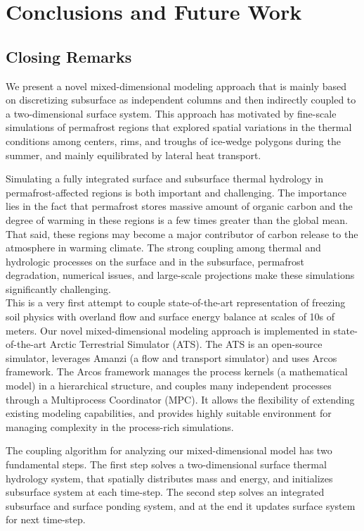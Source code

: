\documentclass[review]{elsarticle}
\begin{document}
\section{Conclusions and Future Work}\label{conclusion}
\subsection{Closing Remarks}
We present a novel mixed-dimensional modeling approach that is mainly based on discretizing subsurface as independent columns and then indirectly coupled to a two-dimensional surface system. This approach has motivated by fine-scale simulations of permafrost regions that explored spatial variations in the thermal conditions among centers, rims, and troughs of ice-wedge polygons during the summer, and mainly equilibrated by lateral heat transport.

Simulating a fully integrated surface and subsurface thermal hydrology in permafrost-affected regions is both important and challenging. The importance lies in the fact that permafrost stores massive amount of organic carbon and the degree of warming in these regions is a few times greater than the global mean. That said, these regions may become a major contributor of carbon release to the atmosphere in warming climate. The strong coupling among thermal and hydrologic processes on the surface and in the subsurface, permafrost degradation, numerical issues, and large-scale projections make these simulations significantly challenging. \\
This is a very first attempt to couple state-of-the-art representation of freezing soil physics with overland flow and surface energy balance at scales of 10s of meters.  Our novel mixed-dimensional modeling approach is implemented in state-of-the-art Arctic Terrestrial Simulator (ATS). The ATS is an open-source simulator, leverages Amanzi (a flow and transport simulator) and uses Arcos framework. The Arcos framework manages the process kernels (a mathematical model) in a hierarchical structure, and couples many independent processes through a Multiprocess Coordinator (MPC). It allows the flexibility of extending existing modeling capabilities, and provides highly suitable environment for managing complexity in the process-rich simulations.

The coupling algorithm for analyzing our mixed-dimensional model has two fundamental steps. The first step solves a two-dimensional surface thermal hydrology system, that spatially distributes mass and energy, and initializes subsurface system at each time-step. The second step solves an integrated subsurface and surface ponding system, and at the end it updates surface system for next time-step.
\end{document}
